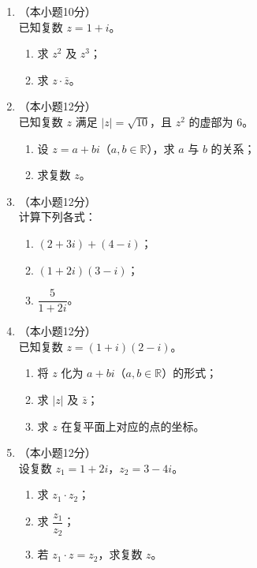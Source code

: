 \documentclass[12pt, a4paper]{ctexart}
\begin{document}
\begin{enumerate}[resume]
\item[17.]（本小题10分）\\
已知复数 $z=1+i$。
\begin{enumerate}[(1)]
  \item 求 $z^2$ 及 $z^3$；
  \item 求 $z\cdot\bar{z}$。
\end{enumerate}

\vspace{6cm}

\item[18.]（本小题12分）\\
已知复数 $z$ 满足 $|z|=\sqrt{10}$，且 $z^2$ 的虚部为 $6$。
\begin{enumerate}[(1)]
  \item 设 $z=a+bi$（$a,b\in\mathbb{R}$），求 $a$ 与 $b$ 的关系；
  \item 求复数 $z$。
\end{enumerate}

\vspace{6cm}

\item[19.]（本小题12分）\\
计算下列各式：
\begin{enumerate}[(1)]
  \item $(2+3i)+(4-i)$；
  \item $(1+2i)(3-i)$；
  \item $\dfrac{5}{1+2i}$。
\end{enumerate}

\vspace{6cm}

\item[20.]（本小题12分）\\
已知复数 $z=(1+i)(2-i)$。
\begin{enumerate}[(1)]
  \item 将 $z$ 化为 $a+bi$（$a,b\in\mathbb{R}$）的形式；
  \item 求 $|z|$ 及 $\bar{z}$；
  \item 求 $z$ 在复平面上对应的点的坐标。
\end{enumerate}

\vspace{6cm}

\item[21.]（本小题12分）\\
设复数 $z_1=1+2i$，$z_2=3-4i$。
\begin{enumerate}[(1)]
  \item 求 $z_1\cdot z_2$；
  \item 求 $\dfrac{z_1}{z_2}$；
  \item 若 $z_1\cdot z=z_2$，求复数 $z$。
\end{enumerate}


\end{enumerate}
\end{document}
